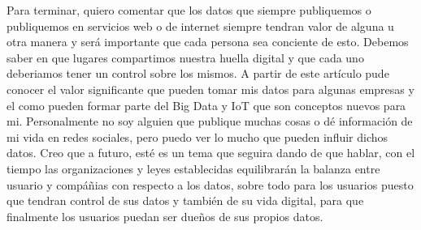 \documentclass[12pt]{report}
\begin{document}
\begin{enumerate}[label=\textbf{\arabic*.}, leftmargin=*]
\begin{enumerate}[label=\textbf{\alph*.}, leftmargin=*, itemsep=1.0em]
Para terminar, quiero comentar que los datos que siempre publiquemos o publiquemos en servicios web o de internet siempre tendran valor de alguna u otra manera y será importante que cada persona sea conciente de esto. Debemos saber en que lugares compartimos nuestra huella digital y que cada uno deberiamos tener un control sobre los mismos. A partir de este artículo pude conocer el valor significante que pueden tomar mis datos para algunas empresas y el como pueden formar parte del Big Data y IoT que son conceptos nuevos para mi. Personalmente no soy alguien que publique muchas cosas o dé información de mi vida en redes sociales, pero puedo ver lo mucho que pueden influir dichos datos. Creo que a futuro, esté es un tema que seguira dando de que hablar, con el tiempo las organizaciones y leyes establecidas equilibrarán la balanza entre usuario y compáñias con respecto a los datos, sobre todo para los usuarios puesto que tendran control de sus datos y también de su vida digital, para que finalmente los usuarios puedan ser dueños de sus propios datos. 
\end{enumerate}

\end{enumerate}
\end{document}
